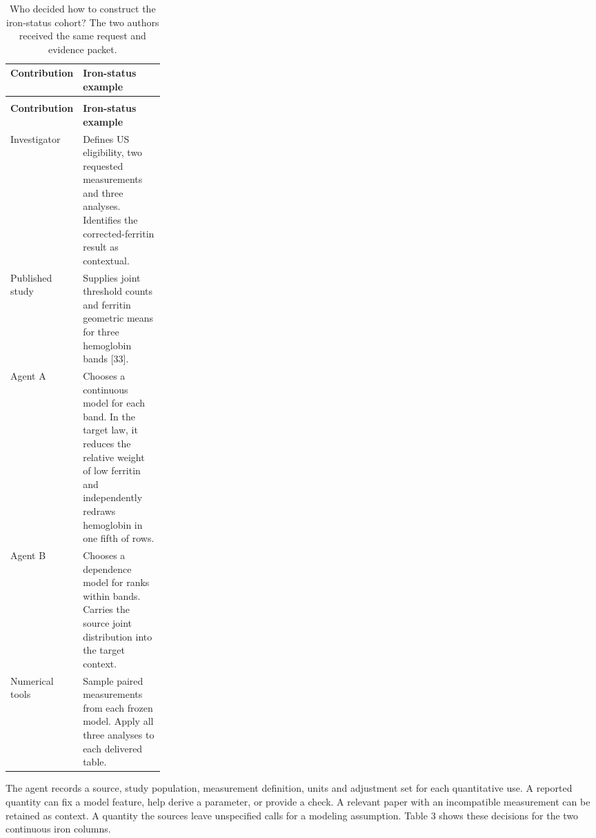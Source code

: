 \documentclass[11pt,letterpaper]{article}
\begin{document}
\renewcommand{\arraystretch}{1.22}

\begin{xltabular}{\linewidth}{@{}>{\raggedright\arraybackslash}p{0.26\linewidth}>{\raggedright\arraybackslash}X@{}}

\caption{Who decided how to construct the iron-status cohort? The two authors received the same request and evidence packet.}\label{tab:2} \\

\toprule

\textbf{Contribution} & \textbf{Iron-status example} \\

\midrule

\endfirsthead

\\

\toprule

\textbf{Contribution} & \textbf{Iron-status example} \\

\midrule

\endhead

\bottomrule

\endfoot

Investigator & Defines US eligibility, two requested measurements and three analyses. Identifies the corrected-ferritin result as contextual. \\

Published study & Supplies joint threshold counts and ferritin geometric means for three hemoglobin bands [33]. \\

Agent A & Chooses a continuous model for each band. In the target law, it reduces the relative weight of low ferritin and independently redraws hemoglobin in one fifth of rows. \\

Agent B & Chooses a dependence model for ranks within bands. Carries the source joint distribution into the target context. \\

Numerical tools & Sample paired measurements from each frozen model. Apply all three analyses to each delivered table. \\

\end{xltabular}

\endgroup

The agent records a source, study population, measurement definition, units and adjustment set for each quantitative use. A reported quantity can fix a model feature, help derive a parameter, or provide a check. A relevant paper with an incompatible measurement can be retained as context. A quantity the sources leave unspecified calls for a modeling assumption. Table 3 shows these decisions for the two continuous iron columns.
\end{document}
